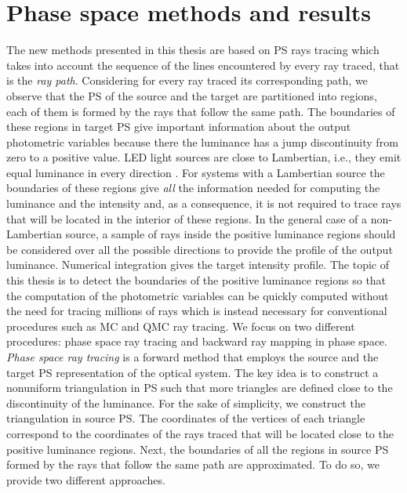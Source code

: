 \section{Phase space methods and results}
The new methods presented in this thesis are based on PS rays tracing which takes into account the sequence of the lines encountered by every ray traced, that is the \textit{ray path}. Considering for every ray traced its corresponding path, we observe that the PS of the source and the target are partitioned into regions, each of them is formed by the rays that follow the same path. The boundaries of these regions in target PS give important information about the output photometric variables because there the luminance has a jump discontinuity from zero to a positive value. LED light sources are close to Lambertian, i.e., they emit equal luminance in every direction \cite{taylor2000illumination}. For systems with a Lambertian source the boundaries of these regions give \textit{all} the information needed for computing the luminance and the intensity and, as a consequence, it is not required to trace rays that will be located in the interior of these regions.
In the general case of a non-Lambertian source, a sample of rays inside the positive luminance regions should be considered over all the possible directions to provide the profile of the output luminance. Numerical integration gives the target intensity profile. The topic of this thesis is to detect the boundaries of the positive luminance regions so that the computation of the photometric variables can be quickly computed without the need for tracing millions of rays which is instead necessary for conventional procedures such as MC and QMC ray tracing. We focus on two different procedures: phase space ray tracing and backward ray mapping in phase space. \\ \indent
\textit{Phase space ray tracing} is a forward method that employs the source and the target PS representation of the optical system. The key idea is to construct a nonuniform triangulation in PS such that more triangles are defined close to the discontinuity of the luminance. For the sake of simplicity, we construct the triangulation in source PS. The coordinates of the vertices of each triangle correspond to the coordinates of the rays traced that will be located close to the positive luminance regions. Next, the boundaries of all the regions in source PS formed by the rays that follow the same path are approximated. To do so, we provide two different approaches.  \\ \indent
